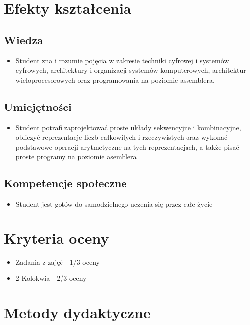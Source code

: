 \documentclass[12pt, a4paper]{article}
\begin{document}
\section{Efekty kształcenia}

\subsection*{Wiedza}
\begin{itemize}
  \item Student zna i rozumie pojęcia w zakresie techniki cyfrowej i systemów cyfrowych, architektury i organizacji systemów komputerowych, architektur wieloprocesorowych oraz programowania na poziomie assemblera.
\end{itemize}

\subsection*{Umiejętności}
\begin{itemize}
  \item Student potrafi zaprojektować proste układy sekwencyjne i kombinacyjne, obliczyć reprezentacje liczb całkowitych i rzeczywistych oraz wykonać podstawowe operacji arytmetyczne na tych reprezentacjach, a także pisać proste programy na poziomie asemblera
\end{itemize}

\subsection*{Kompetencje społeczne}
\begin{itemize}
  \item Student jest gotów do samodzielnego uczenia się przez całe życie
\end{itemize}

\section{Kryteria oceny}

\begin{itemize}
  \item Zadania z zajęć - 1/3 oceny
  \item 2 Kolokwia - 2/3 oceny
\end{itemize}

\section{Metody dydaktyczne}
\end{document}
